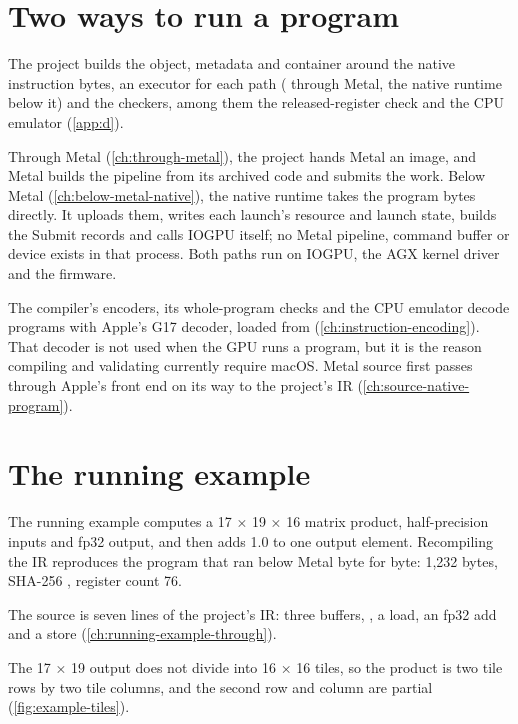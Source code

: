 \section{Two ways to run a program}\label{sec:project-authors-two}

The project builds the object, metadata and container around the native instruction bytes, an executor
for each path ( through Metal, the native runtime below it) and the checkers, among them the
released-register check and the CPU emulator (\cref{app:d}).



Through Metal (\cref{ch:through-metal}), the project hands Metal an image, and Metal builds the pipeline from its
archived code and submits the work. Below Metal (\cref{ch:below-metal-native}), the native runtime takes the program
bytes directly. It uploads them, writes each launch's resource and launch state, builds the Submit records and calls
IOGPU itself; no Metal pipeline, command buffer or device exists in that process. Both paths run on IOGPU, the AGX
kernel driver and the firmware.

The compiler's encoders, its whole-program
checks and the CPU emulator decode programs with Apple's G17 decoder, loaded from 
(\cref{ch:instruction-encoding}). That decoder is not used when the GPU runs a program, but it is the reason compiling and
validating currently require macOS. Metal source first passes through Apple's  front end on its way to the
project's IR (\cref{ch:source-native-program}).

\section{The running example}\label{sec:one-program-ir}

The running example computes a 17 × 19 × 16 matrix product, half-precision inputs and fp32 output, and then adds 1.0
to one output element. Recompiling the IR reproduces the program that ran below Metal byte for byte: 1,232 bytes, SHA-256 ,
register count 76.

The source is seven lines of the project's IR: three buffers, , a
load, an fp32 add and a store (\cref{ch:running-example-through}).

The 17 × 19 output does not divide into 16 × 16 tiles, so the product is two tile rows by two tile columns, and
the second row and column are partial (\cref{fig:example-tiles}).


